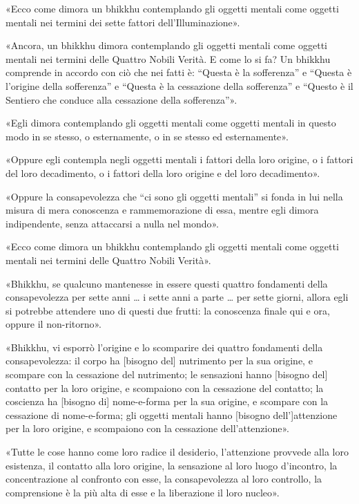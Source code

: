«Ecco come dimora un bhikkhu contemplando gli oggetti mentali come
oggetti mentali nei termini dei sette fattori dell’Illuminazione».


«Ancora, un bhikkhu dimora contemplando gli oggetti mentali come oggetti
mentali nei termini delle Quattro Nobili Verità. E come lo si fa? Un
bhikkhu comprende in accordo con ciò che nei fatti è: “Questa è la
sofferenza” e “Questa è l’origine della sofferenza” e “Questa è la
cessazione della sofferenza” e “Questo è il Sentiero che conduce alla
cessazione della sofferenza”».


«Egli dimora contemplando gli oggetti mentali come oggetti mentali in
questo modo in se stesso, o esternamente, o in se stesso ed
esternamente».


«Oppure egli contempla negli oggetti mentali i fattori della loro
origine, o i fattori del loro decadimento, o i fattori della loro
origine e del loro decadimento».


«Oppure la consapevolezza che “ci sono gli oggetti mentali” si fonda in
lui nella misura di mera conoscenza e rammemorazione di essa, mentre
egli dimora indipendente, senza attaccarsi a nulla nel mondo».


«Ecco come dimora un bhikkhu contemplando gli oggetti mentali come
oggetti mentali nei termini delle Quattro Nobili Verità».


«Bhikkhu, se qualcuno mantenesse in essere questi quattro fondamenti
della consapevolezza per sette anni … i sette anni a parte … per sette
giorni, allora egli si potrebbe attendere uno di questi due frutti: la
conoscenza finale qui e ora, oppure il non-ritorno».




«Bhikkhu, vi esporrò l’origine e lo scomparire dei quattro fondamenti
della consapevolezza: il corpo ha [bisogno del] nutrimento per la sua
origine, e scompare con la cessazione del nutrimento; le sensazioni
hanno [bisogno del] contatto per la loro origine, e scompaiono con la
cessazione del contatto; la coscienza ha [bisogno di] nome-e-forma per
la sua origine, e scompare con la cessazione di nome-e-forma; gli
oggetti mentali hanno [bisogno dell’]attenzione per la loro origine, e
scompaiono con la cessazione dell’attenzione».




«Tutte le cose hanno come loro radice il desiderio, l’attenzione
provvede alla loro esistenza, il contatto alla loro origine, la
sensazione al loro luogo d’incontro, la concentrazione al confronto con
esse, la consapevolezza al loro controllo, la comprensione è la più alta
di esse e la liberazione il loro nucleo».


